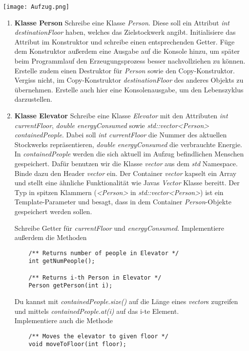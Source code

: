 \documentclass[
  accentcolor=tud1c,	%
  colorbacktitle,		%
  inverttitle,			%
  german,				%
  twoside
]{tudexercise}
\begin{document}
\texttt{[image: Aufzug.png]}

\begin{enumerate}
\item \textbf{Klasse Person}
Schreibe eine Klasse \emph{Person}.
Diese soll ein Attribut \emph{int destinationFloor} haben, welches das Zielstockwerk angibt. 
Initialisiere das Attribut im Konstruktor und schreibe einen entsprechenden Getter.
Füge dem Konstruktor außerdem eine Ausgabe auf die Konsole hinzu, um später beim Programmlauf den Erzeugungsprozess besser nachvollziehen zu können.
Erstelle zudem einen Destruktor für \emph{Person} sowie den Copy-Konstruktor.
Vergiss nicht, im Copy-Konstruktor \emph{destinationFloor} des anderes Objekts zu übernehmen.
Erstelle auch hier eine Konsolenausgabe, um den Lebenszyklus darzustellen.

\item \textbf{Klasse Elevator}
Schreibe eine Klasse \emph{Elevator} mit den Attributen \emph{int currentFloor}, \emph{double energyConsumed} sowie \emph{std::vector<Person> containedPeople}.
Dabei soll \emph{int currentFloor} die Nummer des aktuellen Stockwerks repräsentieren, \emph{double energyConsumed} die verbrauchte Energie. 
In \emph{containedPeople} werden die sich aktuell im Aufzug befindlichen Menschen gespeichert.
Dafür benutzen wir die Klasse \emph{vector} aus dem \emph{std} Namespace.
Binde dazu den Header \emph{vector} ein.
Der Container \emph{vector} kapselt ein Array und stellt eine ähnliche Funktionalität wie Javas \emph{Vector} Klasse bereitt.
Der Typ in spitzen Klammern (\emph{<Person>} in \emph{std::vector<Person>}) ist ein Template-Parameter und besagt, dass in dem Container \emph{Person}-Objekte gespeichert werden sollen.

Schreibe Getter für \emph{currentFloor} und \emph{energyConsumed}.
Implementiere außerdem die Methoden
\begin{lstlisting}
	/** Returns number of people in Elevator */
	int getNumPeople();
	
	/** Returns i-th Person in Elevator */
	Person getPerson(int i);
\end{lstlisting} 

Du kannst mit \emph{containedPeople.size()} auf die Länge eines \emph{vector}s zugreifen und mittels \emph{containedPeople.at(i)} auf das i-te Element. \\

Implementiere auch die Methode
\begin{lstlisting}
	/** Moves the elevator to given floor */
	void moveToFloor(int floor);
\end{lstlisting}


\end{enumerate}
\end{document}
